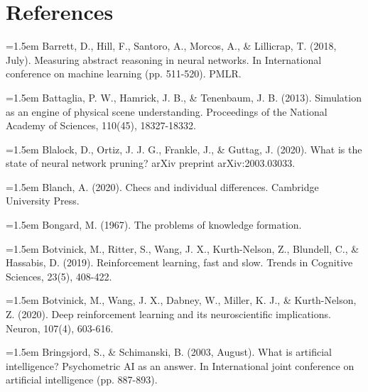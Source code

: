 
\section*{References}

\begingroup
\small
\setlength{\parindent}{0pt}
\setlength{\parskip}{0.6em}

\hangindent=1.5em
Barrett, D., Hill, F., Santoro, A., Morcos, A., \& Lillicrap, T.
(2018, July).
Measuring abstract reasoning in neural networks.
In International conference on machine learning (pp. 511-520).
PMLR.
\par

\hangindent=1.5em
Battaglia, P. W., Hamrick, J. B., \& Tenenbaum, J. B. (2013).
Simulation as an engine of physical scene understanding.
Proceedings of the National Academy of Sciences, 110(45), 18327-18332.
\par

\hangindent=1.5em
Blalock, D., Ortiz, J. J. G., Frankle, J., \& Guttag, J. (2020).
What is the state of neural network pruning?
arXiv preprint arXiv:2003.03033.
\par

\hangindent=1.5em
Blanch, A. (2020).
Checs and individual differences.
Cambridge University Press.
\par

\hangindent=1.5em
Bongard, M. (1967).
The problems of knowledge formation.
\par

\hangindent=1.5em
Botvinick, M., Ritter, S., Wang, J. X., Kurth-Nelson, Z.,
Blundell, C., \& Hassabis, D. (2019).
Reinforcement learning, fast and slow.
Trends in Cognitive Sciences, 23(5), 408-422.
\par

\hangindent=1.5em
Botvinick, M., Wang, J. X., Dabney, W., Miller, K. J.,
\& Kurth-Nelson, Z. (2020).
Deep reinforcement learning and its neuroscientific implications.
Neuron, 107(4), 603-616.
\par

\hangindent=1.5em
Bringsjord, S., \& Schimanski, B. (2003, August).
What is artificial intelligence? Psychometric AI as an answer.
In International joint conference on artificial intelligence
(pp. 887-893).
\par

